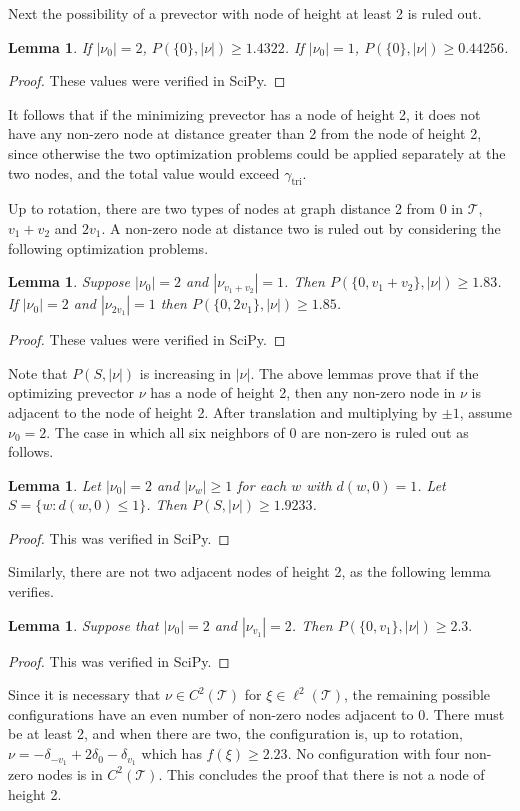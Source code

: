 \documentclass[a4paper, 12pt, notitlepage]{amsart}
\newcommand{\tri}{\operatorname{tri}}
\newcommand{\sT}{\mathscr{T}}
\newtheorem{lemma}[theorem]{Lemma}
\theoremstyle{remark}
\begin{document}
 
 Next the possibility of a prevector with node of height at least 2 is ruled out. 
 \begin{lemma}\label{singleton_lemma}
  If $|\nu_0| = 2$, $P(\{0\}, |\nu|) \geq 1.4322$.  If $|\nu_0| = 1$, $P(\{0\}, |\nu|) \geq 0.44256$.
 \end{lemma}
\begin{proof}
 These values were verified in SciPy.
\end{proof}

 

 It follows that if the minimizing prevector has a node of height 2, it does not have any non-zero node at distance greater than 2 from the node of height 2, since otherwise the two optimization problems could be applied separately at the two nodes, and the total value would exceed $\gamma_{\tri}$.
 
 Up to rotation, there are two types of nodes at graph distance 2 from 0 in $\sT$, $v_1 + v_2$ and $2v_1$.  A non-zero node at distance two is ruled out by considering the following optimization problems.
 
 \begin{lemma}
  Suppose $|\nu_0| = 2$ and $|\nu_{v_1 + v_2}| = 1$.  Then $P(\{0, v_1 + v_2\}, |\nu|) \geq 1.83$.  If $|\nu_0| = 2$ and $|\nu_{2v_1}| = 1$ then $P(\{0, 2v_1\}, |\nu|) \geq 1.85$.
 \end{lemma}

 \begin{proof}
  These values were verified in SciPy.
 \end{proof}
 Note that $P(S, |\nu|)$ is increasing in $|\nu|$.
The above lemmas prove that if the optimizing prevector $\nu$ has a node of height 2, then any non-zero node in $\nu$ is adjacent to the node of height 2. After translation and multiplying by $\pm 1$, assume $\nu_0 = 2$.   The case in which all six neighbors of 0 are non-zero is ruled out as follows.
\begin{lemma}
 Let $|\nu_0| = 2$ and $|\nu_w| \geq 1$ for each $w$ with $d(w,0) = 1$.  Let $S = \{w: d(w,0) \leq 1\}$.  Then $P(S, |\nu|) \geq 1.9233$.
\end{lemma}

\begin{proof}
 This was verified in SciPy.
\end{proof} 

Similarly, there are not two adjacent nodes of height 2, as the following lemma verifies.
\begin{lemma}
 Suppose that $|\nu_0| = 2$ and $|\nu_{v_1}| = 2$.   Then $P(\{0, v_1\}, |\nu|) \geq 2.3.$
\end{lemma}
\begin{proof}
 This was verified in SciPy.
\end{proof}
Since it is necessary that $\nu \in C^2(\sT)$ for $\xi \in \ell^2(\sT)$, the remaining possible configurations have an even number of non-zero nodes adjacent to 0.  There must be at least 2, and when there are two, the configuration is, up to rotation,   $\nu = -\delta_{-v_1} + 2\delta_0 - \delta_{v_1}$ which has $f(\xi) \geq 2.23$.  No configuration with four non-zero nodes is in $C^2(\sT)$.  This concludes the proof that there is not a node of height 2.
\end{document}
